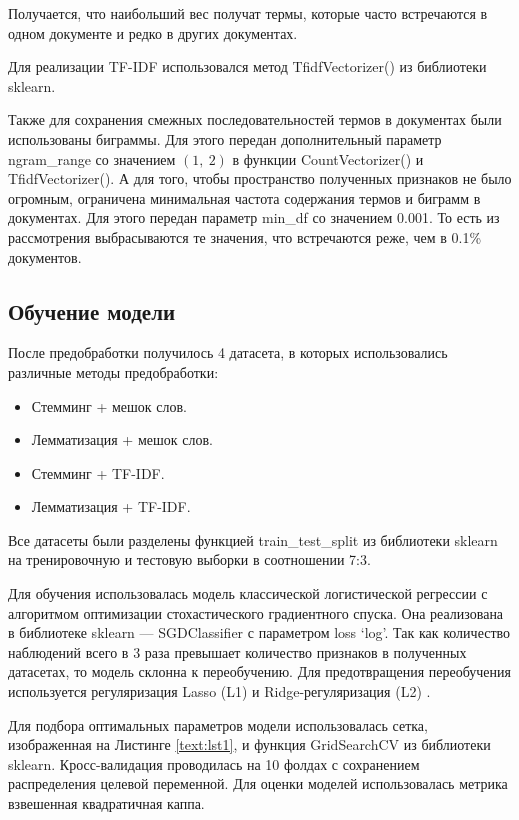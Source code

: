\documentclass[14pt]{mmcs_article}
\begin{document}
Получается, что наибольший вес получат термы, которые часто встречаются в одном документе и редко в других документах.

Для реализации TF-IDF использовался метод TfidfVectorizer() из библиотеки sklearn. 

Также для сохранения смежных последовательностей термов в документах были использованы биграммы. Для этого передан дополнительный параметр ngram\_range со значением $(1,\ 2)$ в функции CountVectorizer() и TfidfVectorizer(). А для того, чтобы пространство полученных признаков не было огромным, ограничена минимальная частота содержания термов и биграмм в документах. Для этого передан параметр min\_df со значением 0.001. То есть из рассмотрения выбрасываются те значения, что встречаются реже, чем в 0.1\% документов.


\subsection{Обучение модели}

После предобработки получилось 4 датасета, в которых использовались различные методы предобработки:
\begin{itemize}
	\item Стемминг + мешок слов.
	\item Лемматизация + мешок слов.
	\item Стемминг + TF-IDF.
	\item Лемматизация + TF-IDF.
\end{itemize}

Все датасеты были разделены функцией train\_test\_split из библиотеки sklearn на тренировочную и тестовую выборки в соотношении 7:3.

Для обучения использовалась модель классической логистической регрессии с алгоритмом оптимизации стохастического градиентного спуска. Она реализована в библиотеке sklearn --- SGDClassifier с параметром loss `log'.  Так как количество наблюдений всего в 3 раза превышает количество признаков в полученных датасетах, то модель склонна к переобучению. Для предотвращения переобучения используется регуляризация Lasso (L1) и Ridge-регуляризация (L2) \cite{lib:regular}.

Для подбора оптимальных параметров модели использовалась сетка, изображенная на Листинге \ref{text:lst1}, и функция GridSearchCV из библиотеки sklearn. Кросс-валидация проводилась на 10 фолдах с сохранением распределения целевой переменной. Для оценки моделей использовалась метрика взвешенная квадратичная каппа.
\end{document}
